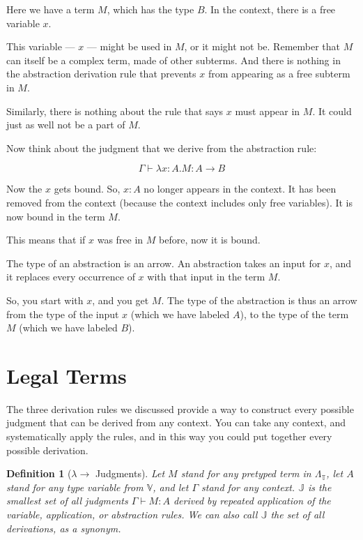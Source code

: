 \documentclass{book}
\numberwithin{equation}{chapter}
\newtheorem{definition}{Definition}
\begin{document}
\noindent
Here we have a term $M$, which has the type $B$. In the context, there is a free variable $x$.

This variable --- $x$ --- might be used in $M$, or it might not be. Remember that $M$ can itself be a complex term, made of other subterms. And there is nothing in the abstraction derivation rule that prevents $x$ from appearing as a free subterm in $M$. 

Similarly, there is nothing about the rule that says $x$ must appear in $M$. It could just as well not be a part of $M$.

Now think about the judgment that we derive from the abstraction rule:

\begin{equation}
\Gamma \vdash \lambda x : A.M : A \rightarrow B
\end{equation}

\noindent
Now the $x$ gets bound. So, $x : A$ no longer appears in the context. It has been removed from the context (because the context includes only free variables). It is now bound in the term $M$. 

This means that if $x$ was free in $M$ before, now it is bound.

The type of an abstraction is an arrow. An abstraction takes an input for $x$, and it replaces every occurrence of $x$ with that input in the term $M$. 

So, you start with $x$, and you get $M$. The type of the abstraction is thus an arrow from the type of the input $x$ (which we have labeled $A$), to the type of the term $M$ (which we have labeled $B$).


\section{Legal Terms}

The three derivation rules we discussed provide a way to construct every possible judgment that can be derived from any context. You can take any context, and systematically apply the rules, and in this way you could put together every possible derivation.

\begin{definition}[$\lambda\rightarrow$ Judgments]
Let $M$ stand for any pretyped term in $\Lambda_{\mathbb{T}}$, let $A$ stand for any type variable from $\mathbb{V}$, and let $\Gamma$ stand for any context. $\mathbb{J}$ is the smallest set of all judgments $\Gamma \vdash M : A$ derived by repeated application of the variable, application, or abstraction rules. We can also call $\mathbb{J}$ the set of all derivations, as a synonym.
\end{definition}
\end{document}
